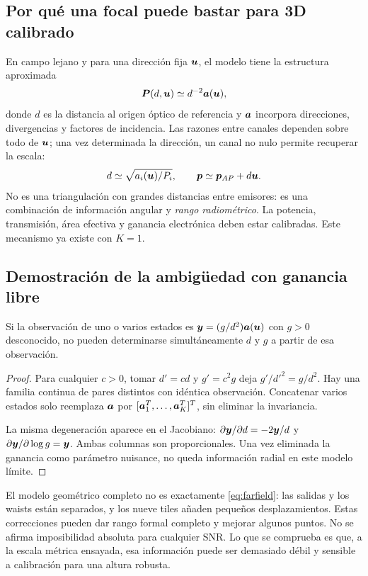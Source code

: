 \subsection{Por qué una focal puede bastar para 3D calibrado}
En campo lejano y para una dirección fija $\bm{u}$, el modelo tiene la estructura aproximada
\begin{equation}\label{eq:farfield}
\bm{P}(d,\bm{u})\simeq d^{-2}\bm{a}(\bm{u}),
\end{equation}
donde $d$ es la distancia al origen óptico de referencia y $\bm{a}$ incorpora direcciones, divergencias y factores de incidencia. Las razones entre canales dependen sobre todo de $\bm{u}$; una vez determinada la dirección, un canal no nulo permite recuperar la escala:
\begin{equation}
d\simeq\sqrt{a_i(\bm{u})/P_i},\qquad \bm{p}\simeq\bm{p}_{AP}+d\bm{u}.
\end{equation}
No es una triangulación con grandes distancias entre emisores: es una combinación de información angular y \emph{rango radiométrico}. La potencia, transmisión, área efectiva y ganancia electrónica deben estar calibradas. Este mecanismo ya existe con $K=1$.

\subsection{Demostración de la ambigüedad con ganancia libre}
\begin{proposicion}
Si la observación de uno o varios estados es $\bm{y}=(g/d^2)\bm{a}(\bm{u})$ con $g>0$ desconocido, no pueden determinarse simultáneamente $d$ y $g$ a partir de esa observación.
\end{proposicion}
\begin{proof}
Para cualquier $c>0$, tomar $d'=cd$ y $g'=c^2g$ deja $g'/d'^2=g/d^2$. Hay una familia continua de pares distintos con idéntica observación. Concatenar varios estados solo reemplaza $\bm{a}$ por $[\bm{a}_1^T,\ldots,\bm{a}_K^T]^T$, sin eliminar la invariancia.

La misma degeneración aparece en el Jacobiano: $\partial\bm{y}/\partial d=-2\bm{y}/d$ y $\partial\bm{y}/\partial\log g=\bm{y}$. Ambas columnas son proporcionales. Una vez eliminada la ganancia como parámetro nuisance, no queda información radial en este modelo límite.
\end{proof}

El modelo geométrico completo no es exactamente \eqref{eq:farfield}: las salidas y los waists están separados, y los nueve tiles añaden pequeños desplazamientos. Estas correcciones pueden dar rango formal completo y mejorar algunos puntos. No se afirma imposibilidad absoluta para cualquier SNR. Lo que se comprueba es que, a la escala métrica ensayada, esa información puede ser demasiado débil y sensible a calibración para una altura robusta.

